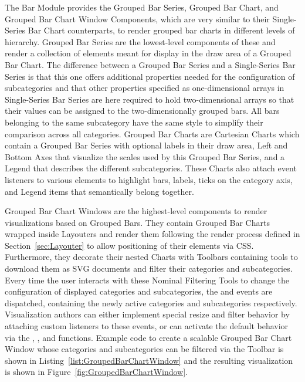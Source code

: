 The Bar Module provides the Grouped Bar Series, Grouped Bar Chart, and
Grouped Bar Chart Window Components, which are very similar to their
Single-Series Bar Chart counterparts, to render grouped bar charts in
different levels of hierarchy. Grouped Bar Series are the lowest-level
components of these and render a collection of  elements
meant for display in the draw area of a Grouped Bar Chart. The
difference between a Grouped Bar Series and a Single-Series Bar Series
is that this one offers additional properties needed for the
configuration of subcategories and that other properties specified as
one-dimensional arrays in Single-Series Bar Series are here required
to hold two-dimensional arrays so that their values can be assigned to
the two-dimensionally grouped bars. All bars belonging to the same
subcategory have the same style to simplify their comparison across
all categories. Grouped Bar Charts are Cartesian Charts which contain a
Grouped Bar Series with optional labels in their draw area, Left and
Bottom Axes that visualize the scales used by this Grouped Bar Series,
and a Legend that describes the different subcategories. These Charts
also attach event listeners to various elements to highlight bars,
labels, ticks on the category axis, and Legend items that semantically
belong together.

Grouped Bar Chart Windows are the highest-level components to render
visualizations based on Grouped Bars. They contain Grouped Bar Charts
wrapped inside Layouters and render them following the render process
defined in Section~\ref{sec:Layouter} to allow positioning of their
elements via CSS. Furthermore, they decorate their nested Charts with
Toolbars containing tools to download them as SVG documents and filter
their categories and subcategories. Every time the user interacts with
these Nominal Filtering Tools to change the configuration of displayed
categories and subcategories, the  and
 events are dispatched, containing the newly
active categories and subcategories respectively. Visualization
authors can either implement special resize and filter behavior by
attaching custom listeners to these events, or can activate the
default behavior via the ,
, and
 functions.
Example code to create a scalable Grouped Bar Chart Window whose
categories and subcategories can be filtered via the Toolbar is shown
in Listing~\ref{list:GroupedBarChartWindow} and the resulting
visualization is shown in Figure~\ref{fig:GroupedBarChartWindow}.



